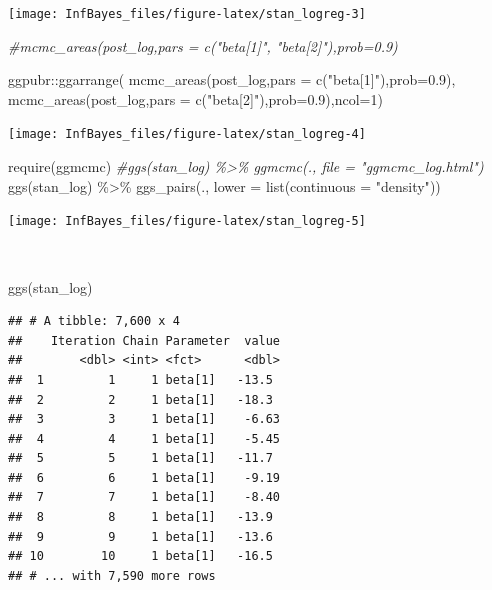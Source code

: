 \documentclass[
]{book}
\newenvironment{Shaded}{\begin{snugshade}}{\end{snugshade}}
\newcommand{\AttributeTok}[1]{\textcolor[rgb]{0.77,0.63,0.00}{#1}}
\newcommand{\CommentTok}[1]{\textcolor[rgb]{0.56,0.35,0.01}{\textit{#1}}}
\newcommand{\DecValTok}[1]{\textcolor[rgb]{0.00,0.00,0.81}{#1}}
\newcommand{\FloatTok}[1]{\textcolor[rgb]{0.00,0.00,0.81}{#1}}
\newcommand{\FunctionTok}[1]{\textcolor[rgb]{0.00,0.00,0.00}{#1}}
\newcommand{\NormalTok}[1]{#1}
\newcommand{\SpecialCharTok}[1]{\textcolor[rgb]{0.00,0.00,0.00}{#1}}
\newcommand{\StringTok}[1]{\textcolor[rgb]{0.31,0.60,0.02}{#1}}
\begin{document}
\begin{center}\texttt{[image: InfBayes\_files/figure-latex/stan\_logreg-3]} \end{center}

\begin{Shaded}
\begin{Highlighting}[]
\CommentTok{\#mcmc\_areas(post\_log,pars = c("beta[1]", "beta[2]"),prob=0.9)}

\NormalTok{ggpubr}\SpecialCharTok{::}\FunctionTok{ggarrange}\NormalTok{(}
  \FunctionTok{mcmc\_areas}\NormalTok{(post\_log,}\AttributeTok{pars =} \FunctionTok{c}\NormalTok{(}\StringTok{"beta[1]"}\NormalTok{),}\AttributeTok{prob=}\FloatTok{0.9}\NormalTok{),}
  \FunctionTok{mcmc\_areas}\NormalTok{(post\_log,}\AttributeTok{pars =} \FunctionTok{c}\NormalTok{(}\StringTok{"beta[2]"}\NormalTok{),}\AttributeTok{prob=}\FloatTok{0.9}\NormalTok{),}\AttributeTok{ncol=}\DecValTok{1}\NormalTok{)}
\end{Highlighting}
\end{Shaded}

\begin{center}\texttt{[image: InfBayes\_files/figure-latex/stan\_logreg-4]} \end{center}

\begin{Shaded}
\begin{Highlighting}[]
\FunctionTok{require}\NormalTok{(ggmcmc)}
\CommentTok{\#ggs(stan\_log) \%\textgreater{}\% ggmcmc(., file = "ggmcmc\_log.html")}
\FunctionTok{ggs}\NormalTok{(stan\_log) }\SpecialCharTok{\%\textgreater{}\%} \FunctionTok{ggs\_pairs}\NormalTok{(., }\AttributeTok{lower =} \FunctionTok{list}\NormalTok{(}\AttributeTok{continuous =} \StringTok{"density"}\NormalTok{))}
\end{Highlighting}
\end{Shaded}

\begin{center}\texttt{[image: InfBayes\_files/figure-latex/stan\_logreg-5]} \end{center}

\(~\)

\begin{Shaded}
\begin{Highlighting}[]
\FunctionTok{ggs}\NormalTok{(stan\_log)}
\end{Highlighting}
\end{Shaded}

\begin{verbatim}
## # A tibble: 7,600 x 4
##    Iteration Chain Parameter  value
##        <dbl> <int> <fct>      <dbl>
##  1         1     1 beta[1]   -13.5 
##  2         2     1 beta[1]   -18.3 
##  3         3     1 beta[1]    -6.63
##  4         4     1 beta[1]    -5.45
##  5         5     1 beta[1]   -11.7 
##  6         6     1 beta[1]    -9.19
##  7         7     1 beta[1]    -8.40
##  8         8     1 beta[1]   -13.9 
##  9         9     1 beta[1]   -13.6 
## 10        10     1 beta[1]   -16.5 
## # ... with 7,590 more rows
\end{verbatim}
\end{document}
